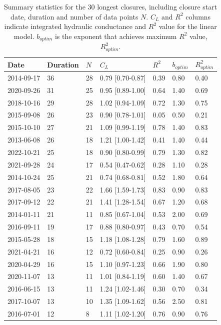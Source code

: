 \documentclass[preprint,12pt,authoryear]{elsarticle}
\begin{document}
\begin{table}[]    
    \centering
\caption{Summary statistics for the 30 longest closures, including closure start date, duration and number of data points $N$. $C_L$ and $R^2$ columns indicate integrated hydraulic conductance and $R^2$ value for the linear model.  $b_{optim}$ is the exponent that achieves maximum $R^2$ value, $R^2_{optim}$. }   
    \small
\begin{tabular}{lllll|ll}
\hline
Date & Duration & $N$ & $C_L$ & $R^2$ & $b_{optim}$ & $R^2_{optim}$ \\
\hline
2014-09-17 & 36 & 28 & 0.79 [0.70-0.87] & 0.39 & 0.80 & 0.40 \\
2020-09-26 & 31 & 25 & 0.95 [0.89-1.00] & 0.64 & 1.40 & 0.69 \\
2018-10-16 & 29 & 28 & 1.02 [0.94-1.09] & 0.72 & 1.30 & 0.75 \\
2015-09-08 & 26 & 23 & 0.90 [0.78-1.01] & 0.05 & 0.50 & 0.21 \\
2015-10-10 & 27 & 21 & 1.09 [0.99-1.19] & 0.78 & 1.40 & 0.83 \\
2013-06-08 & 26 & 18 & 1.21 [1.00-1.42] & 0.41 & 1.40 & 0.44 \\
2022-10-21 & 25 & 18 & 0.90 [0.80-0.99] & 0.79 & 1.30 & 0.82 \\
2021-09-28 & 24 & 17 & 0.54 [0.47-0.62] & 0.28 & 1.10 & 0.28 \\
2014-10-24 & 25 & 21 & 0.74 [0.68-0.81] & 0.52 & 1.80 & 0.64 \\
2017-08-05 & 23 & 22 & 1.66 [1.59-1.73] & 0.83 & 0.90 & 0.83 \\
2017-09-12 & 22 & 21 & 1.41 [1.28-1.54] & 0.67 & 1.20 & 0.68 \\
2014-01-11 & 21 & 11 & 0.85 [0.67-1.04] & 0.53 & 2.00 & 0.69 \\
2016-09-11 & 19 & 17 & 0.88 [0.80-0.97] & 0.43 & 0.70 & 0.54 \\
2015-05-28 & 18 & 15 & 1.18 [1.08-1.28] & 0.79 & 1.60 & 0.89 \\
2021-04-21 & 16 & 12 & 0.72 [0.60-0.84] & 0.25 & 0.90 & 0.26 \\
2020-04-29 & 16 & 15 & 1.10 [0.97-1.23] & 0.66 & 1.90 & 0.80 \\
2020-11-07 & 13 & 11 & 1.01 [0.84-1.19] & 0.60 & 1.40 & 0.67 \\
2016-06-15 & 13 & 11 & 1.24 [1.02-1.46] & 0.30 & 0.70 & 0.34 \\
2017-10-07 & 13 & 10 & 1.35 [1.09-1.62] & 0.56 & 2.50 & 0.81 \\
2016-07-01 & 12 & 8 & 1.11 [1.02-1.20] & 0.76 & 0.90 & 0.76 \\

\end{tabular}
\end{table}
\end{document}
